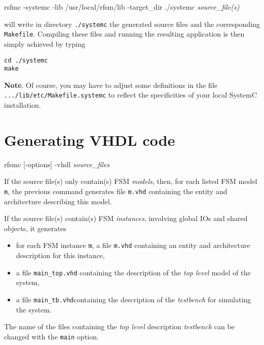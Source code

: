 \begin{FVerbatim}[commandchars=\\\{\}]
rsfmc -systemc -lib /usr/local/rfsm/lib -target_dir ./systemc \emph{source_file(s)}
\end{FVerbatim}

will write in directory \verb|./systemc| the generated source files and the corresponding
\verb|Makefile|. Compiling these files and running the resulting application is then simply achieved
by typing

\begin{verbatim}
cd ./systemc
make 
\end{verbatim}

\medskip
\textbf{Note}. Of course, you may have to adjust some definitions in the file
\verb|.../lib/etc/Makefile.systemc| to reflect the specificities of your local SystemC installation. 

\section{Generating VHDL code}
\label{sec:generating-vhdl-code}

\begin{FVerbatim}[commandchars=\\\{\}]
rfsmc [-options] -vhdl \emph{source_files}
\end{FVerbatim}

If the source file(s) only contain(s) FSM \emph{models}, then, for each listed FSM model \texttt{m}, 
the previous command generates file \verb|m.vhd| containing the entity and architecture describing
this model.

\medskip
If the source file(s) contain(s) FSM \emph{instances}, involving global IOs
and shared objects, it generates
\begin{itemize}
\item for each FSM instance \verb|m|, a file \verb|m.vhd| containing an entity and architecture
  description for this instance,
\item a file \verb|main_top.vhd| containing the description of the \emph{top level} model of the
  system,
\item a file \verb|main_tb.vhd|containing the description of the \emph{testbench} for
  simulating the system.
\end{itemize}

\medskip The name of the files containing the \emph{top level} description \emph{testbench} can be
changed with the \verb|main| option.


